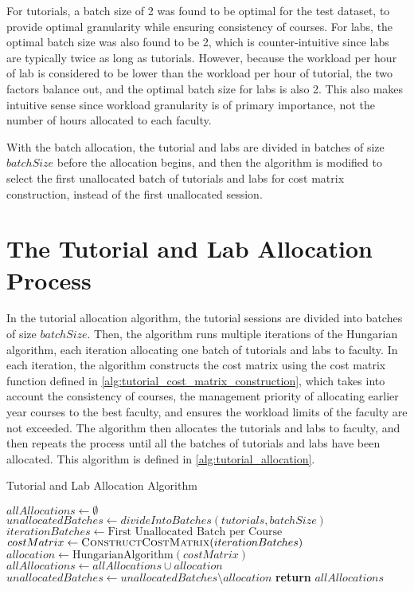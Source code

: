 For tutorials, a batch size of 2 was found to be optimal for the test dataset, to provide optimal granularity while ensuring consistency of courses. For labs, the optimal batch size was also found to be 2, which is counter-intuitive since labs are typically twice as long as tutorials. However, because the workload per hour of lab is considered to be lower than the workload per hour of tutorial, the two factors balance out, and the optimal batch size for labs is also 2. This also makes intuitive sense since workload granularity is of primary importance, not the number of hours allocated to each faculty.

With the batch allocation, the tutorial and labs are divided in batches of size $batchSize$ before the allocation begins, and then the algorithm is modified to select the first unallocated batch of tutorials and labs for cost matrix construction, instead of the first unallocated session.


\section{The Tutorial and Lab Allocation Process}

In the tutorial allocation algorithm, the tutorial sessions are divided into batches of size $batchSize$. Then, the algorithm runs multiple iterations of the Hungarian algorithm, each iteration allocating one batch of tutorials and labs to faculty. In each iteration, the algorithm constructs the cost matrix using the cost matrix function defined in \autoref{alg:tutorial_cost_matrix_construction}, which takes into account the consistency of courses, the management priority of allocating earlier year courses to the best faculty, and ensures the workload limits of the faculty are not exceeded. The algorithm then allocates the tutorials and labs to faculty, and then repeats the process until all the batches of tutorials and labs have been allocated. This algorithm is defined in \autoref{alg:tutorial_allocation}.

\begin{algorithm}[H]
  \caption{Tutorial and Lab Allocation Algorithm}
  \begin{algorithmic}
    \State $allAllocations \gets \emptyset$
    \State $unallocatedBatches \gets divideIntoBatches(tutorials, batchSize)$
    \State $iterationBatches \gets \text{First Unallocated Batch per Course}$
    \State $costMatrix \gets \Call{ConstructCostMatrix}{iterationBatches}$
    \State $allocation \gets \text{HungarianAlgorithm}(costMatrix)$
    \State $allAllocations \gets allAllocations \cup allocation$
    \State $unallocatedBatches \gets unallocatedBatches \setminus allocation$
    \EndWhile
    \State \textbf{return} $allAllocations$
    \EndProcedure
  \end{algorithmic}
  \label{alg:tutorial_allocation}
\end{algorithm}

